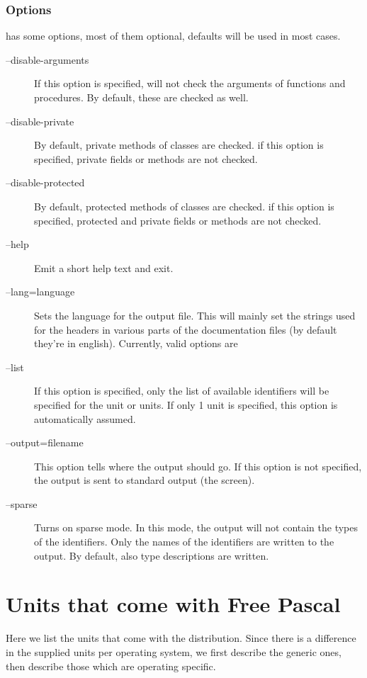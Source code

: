 \subsection{Options}
 has some options, most of them optional, defaults will be used in most
cases.

\begin{description}
\item[--disable-arguments] If this option is specified,  
will not check the arguments of functions and procedures. By default, 
these are checked as well.
\item[--disable-private] By default, private methods of classes are checked. 
if this option is specified, private fields or methods are not checked.
\item[--disable-protected] By default, protected  methods of classes are 
checked. if this option is specified, protected and private fields or 
methods are not checked.
\item[--help] Emit a short help text and exit.
\item[--lang=language] Sets the language for the output file. This will mainly 
set the strings used for the headers in various parts of the documentation files 
(by default they're in english). Currently, valid options are
\item[--list] If this option is specified, only the list of available identifiers will be
specified for the unit or units. If only 1 unit is specified, this option is
automatically assumed.
\item[--output=filename] This option tells  where the output should go. 
If this option is not specified, the output is sent to standard output (the screen).
\item[--sparse] Turns on sparse mode. In this mode, the output will not contain the types of
the identifiers. Only the names of the identifiers are written to the
output. By default, also type descriptions are written.
\end{description}

\chapter{Units that come with Free Pascal}
\label{ch:Units}

Here we list the units that come with the \fpc distribution. Since there is
a difference in the supplied units per operating system, we first describe
the generic ones, then describe those which are operating specific. 

